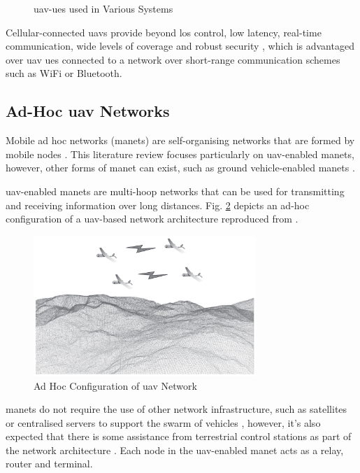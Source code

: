 \begin{figure}[ht!]
{        }
       \caption{\acrshort{uav}-\acrshort{ue}s used in Various Systems}
       \label{fig:uav_ue_applications}
\end{figure} 
Cellular-connected \acrshort{uav}s provide beyond \acrshort{los} control, low latency, real-time communication, wide levels of coverage and robust security \cite{challita_machine_2019}, which is advantaged over \acrshort{uav} \acrshort{ue}s connected to a network over short-range communication schemes such as WiFi or Bluetooth. 

\subsection{\texorpdfstring{Ad-Hoc \acrshort{uav}}{Ad-Hoc UAV} Networks}
Mobile ad hoc networks (\acrshort{manet}s) are self-organising networks that are formed by mobile nodes \cite{namuduri_mobile_nodate, namuduri_uav_2017, sahingoz_mobile_2013}. This literature review focuses particularly on \acrshort{uav}-enabled \acrshort{manet}s, however, other forms of \acrshort{manet} can exist, such as ground vehicle-enabled \acrshort{manet}s \cite{namuduri_mobile_nodate}. 

\acrshort{uav}-enabled \acrshort{manet}s are multi-hoop networks that can be used for transmitting and receiving information over long distances. 
Fig. \ref{fig:uav_ad_hoc_namuduri} depicts an ad-hoc configuration of a \acrshort{uav}-based network architecture reproduced from \cite{namuduri_mobile_nodate}. 

\begin{figure}[ht]
    \centering
    \includegraphics[width=0.75\textwidth]{figures/uav_ad_hoc_saad_textbook.png}
    \caption{Ad Hoc Configuration of \acrshort{uav} Network}
    \label{fig:uav_ad_hoc_namuduri}
\end{figure}
\acrshort{manet}s do not require the use of other network infrastructure, such as satellites or centralised servers to support the swarm of vehicles \cite{namuduri_uav_2017}, however, it's also expected that there is some assistance from terrestrial control stations as part of the network architecture \cite{namuduri_mobile_nodate}. 
Each node in the \acrshort{uav}-enabled \acrshort{manet} acts as a relay, router and terminal. 

